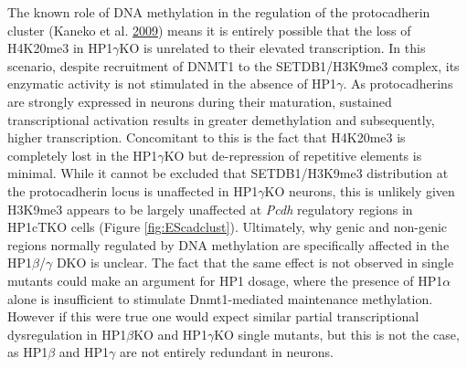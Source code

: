 \documentclass[onehalf,12pt]{beavtex}
\begin{document}
  The known role of DNA methylation in the regulation of the protocadherin
  cluster (Kaneko et al.
  \protect\hyperlink{ref-KanekoExpressionlevelsProtocadherina2009}{2009})
  means it is entirely possible that the loss of H4K20me3 in
  HP1\(\gamma\)KO is unrelated to their elevated transcription. In this
  scenario, despite recruitment of DNMT1 to the SETDB1/H3K9me3 complex,
  its enzymatic activity is not stimulated in the absence of
  HP1\(\gamma\). As protocadherins are strongly expressed in neurons
  during their maturation, sustained transcriptional activation results in
  greater demethylation and subsequently, higher transcription.
  Concomitant to this is the fact that H4K20me3 is completely lost in the
  HP1\(\gamma\)KO but de-repression of repetitive elements is minimal.
  While it cannot be excluded that SETDB1/H3K9me3 distribution at the
  protocadherin locus is unaffected in HP1\(\gamma\)KO neurons, this is
  unlikely given H3K9me3 appears to be largely unaffected at \emph{Pcdh}
  regulatory regions in HP1cTKO cells (Figure \ref{fig:EScadclust}).
  Ultimately, why genic and non-genic regions normally regulated by DNA
  methylation are specifically affected in the HP1\(\beta\)/\(\gamma\) DKO
  is unclear. The fact that the same effect is not observed in single
  mutants could make an argument for HP1 dosage, where the presence of
  HP1\(\alpha\) alone is insufficient to stimulate Dnmt1-mediated
  maintenance methylation. However if this were true one would expect
  similar partial transcriptional dysregulation in HP1\(\beta\)KO and
  HP1\(\gamma\)KO single mutants, but this is not the case, as
  HP1\(\beta\) and HP1\(\gamma\) are not entirely redundant in neurons.
  
\end{document}

